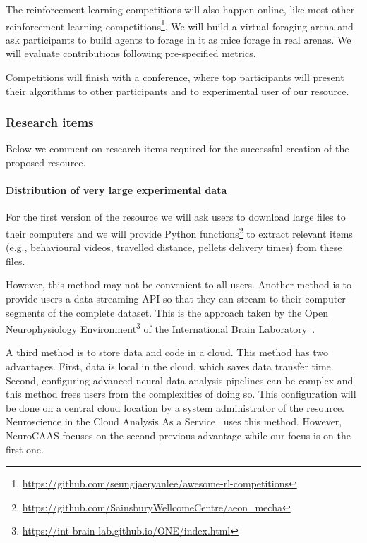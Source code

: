 The reinforcement learning competitions will also happen online, like most
other reinforcement learning
competitions\footnote{\url{https://github.com/seungjaeryanlee/awesome-rl-competitions}}.
We will build a virtual foraging arena and ask participants to build agents to
forage in it as mice forage in real arenas. We will evaluate contributions
following pre-specified metrics.

Competitions will finish with a conference, where top participants will present
their algorithms to other participants and to experimental user of our
resource.

\subsubsection{Research items}
\label{sec:research}

Below we comment on research items required for the successful creation of the
proposed resource.

\paragraph{Distribution of very large experimental data}

For the first version of the resource we will ask users to download large files
to their computers and we will provide Python
functions\footnote{\url{https://github.com/SainsburyWellcomeCentre/aeon\_mecha}}
to extract relevant items (e.g., behavioural videos, travelled distance, pellets
delivery times) from these files.

However, this method may not be convenient to all users. Another method is to
provide users a data streaming API so that they can stream to their computer
segments of the complete dataset. This is the approach taken by the Open
Neurophysiology
Environment\footnote{\url{https://int-brain-lab.github.io/ONE/index.html}} of
the International Brain Laboratory~\citep{bonacchiEtAl23}.

A third method is to store data and code in a cloud. This method
has two advantages. First, data is local in the cloud, which saves data transfer
time. Second, configuring advanced neural data analysis pipelines can be
complex and this method frees users from the complexities of doing so. This
configuration will be done on a central cloud location by a system
administrator of the resource. Neuroscience in the Cloud Analysis As a
Service~\citep[NeuroCAAS][]{abeEtAl22} uses this method. However, NeuroCAAS
focuses on the second previous advantage while our focus is on the first one.

